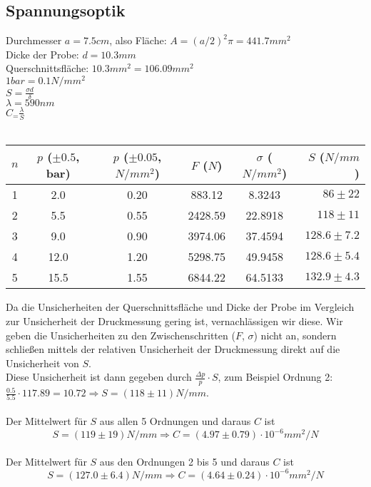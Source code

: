 \documentclass[twoside]{article}
\begin{document}
\subsection{Spannungsoptik}
Durchmesser $a=7.5cm$, also Fläche: $A=(a/2)^2\pi=441.7mm^2$\\
Dicke der Probe: $d=10.3mm$\\
Querschnittsfläche: $10.3mm^2=106.09mm^2$\\
$1 bar = 0.1 N/mm^2$\\
$S=\frac{\sigma d}{\delta}$\\
$\lambda=590nm$\\
$C_=\frac{\lambda}{S}$\\
\\
\begin{table}[H]
\begin{center}
\begin{tabular}{|c|c|c|c|c|r|}
\hline
$n$ & $p$ ($\pm 0.5$, bar) & $p$ ($\pm 0.05$, $\si{N/mm^2}$) & $F$ ($N$) & $\sigma$ ($\si{N/mm^2}$) & $S$ ($\si{N/mm}$)\\
\hline
1 & 2.0 & 0.20 & 883.12 & 8.3243 & $86 \pm 22$\\
2 & 5.5 & 0.55 & 2428.59 & 22.8918 & $118 \pm 11$\\
3 & 9.0 & 0.90 & 3974.06 & 37.4594 & $128.6 \pm 7.2$\\
4 & 12.0 & 1.20 & 5298.75 & 49.9458 & $128.6 \pm 5.4$\\
5 & 15.5 & 1.55 & 6844.22 & 64.5133 & $132.9 \pm 4.3$\\
\hline
\end{tabular}
\end{center}
\end{table}
\vspace{0.5mm}

Da die Unsicherheiten der Querschnittsfläche und Dicke der Probe im Vergleich zur Unsicherheit der Druckmessung gering ist, vernachlässigen wir diese. Wir geben die Unsicherheiten zu den Zwischenschritten ($F$, $\sigma$) nicht an, sondern schließen mittels der relativen Unsicherheit der Druckmessung direkt auf die Unsicherheit von $S$.\\
Diese Unsicherheit ist dann gegeben durch $\frac{\Delta p}{p} \cdot S$, zum Beispiel Ordnung 2: $\frac{0.5}{5.5} \cdot 117.89=10.72 \Rightarrow S=(118 \pm 11) \si{N/mm}$.\\
\\
Der Mittelwert für $S$ aus allen 5 Ordnungen und daraus $C$ ist
$$S=(119 \pm 19)\si{N/mm} \Rightarrow C=(4.97 \pm 0.79) \cdot 10^{-6}\si{mm^2/N}$$
\\
Der Mittelwert für $S$ aus den Ordnungen 2 bis 5 und daraus $C$ ist
$$\boxed{S=(127.0 \pm 6.4)\si{N/mm} \Rightarrow C=(4.64 \pm 0.24) \cdot 10^{-6}\si{mm^2/N}}$$
\end{document}
